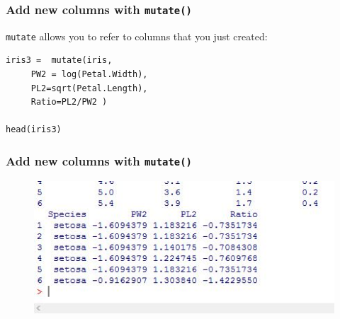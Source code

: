 \documentclass{beamer}
\begin{document}
\begin{frame}[fragile]
	
	\frametitle{Add new columns with \texttt{mutate()} }
\texttt{mutate} allows you to refer to columns that you just created:

\begin{verbatim}
iris3 =  mutate(iris, 
     PW2 = log(Petal.Width), 
     PL2=sqrt(Petal.Length), 
     Ratio=PL2/PW2 )
     
head(iris3)
\end{verbatim}
\end{frame} 
\begin{frame}

\frametitle{Add new columns with \texttt{mutate()} }
	\begin{figure}
		\centering
		\includegraphics[width=0.9\linewidth]{irismutate2}
		
	\end{figure}
	
\end{frame}
\end{document}
